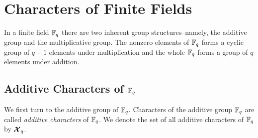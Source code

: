 \section{Characters of Finite Fields}\label{sec:chars-finite-fields}
In a finite field $\mathbb{F}_q$ there are two inherent group structures--namely, the additive group and the multiplicative group. The nonzero elements of $\mathbb{F}_q$ forms a cyclic group of $q-1$ elements under multiplication and the whole $\mathbb{F}_q$ forms a group of $q$ elements under addition.

\subsection{Additive Characters of \texorpdfstring{$\mathbb{F}_q$}{Fq}}
We first turn to the additive group of $\mathbb{F}_q$. Characters of the additive group $\mathbb{F}_q$ are called \emph{additive characters} of $\mathbb{F}_q$. We denote the set of all additive characters of $\mathbb{F}_q$ by $\boldsymbol{\mathcal{X}}_q$. 

